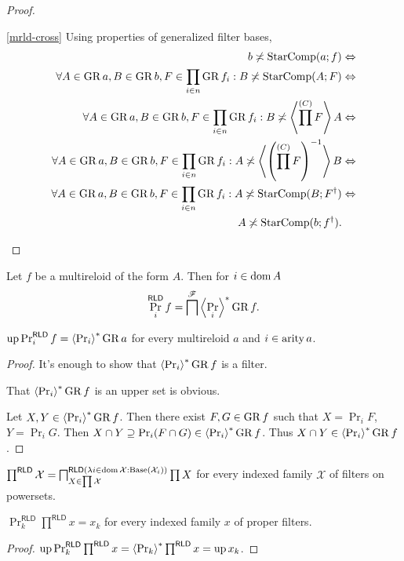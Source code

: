 \begin{proof}
\begin{widedisorder}
\item [{\ref{mrld-cross}}] Using properties of generalized filter bases,
\begin{align*}
b\not\asymp\operatorname{StarComp}(a;f) & \Leftrightarrow\\
\forall A\in\operatorname{GR} a,B\in\operatorname{GR} b,F\in\prod_{i\in n}\operatorname{GR} f_{i}:B\not\asymp\operatorname{StarComp}(A;F) & \Leftrightarrow\\
\forall A\in\operatorname{GR} a,B\in\operatorname{GR} b,F\in\prod_{i\in n}\operatorname{GR} f_{i}:B\not\asymp\left\langle \prod^{(C)}F\right\rangle A & \Leftrightarrow\\
\forall A\in\operatorname{GR} a,B\in\operatorname{GR} b,F\in\prod_{i\in n}\operatorname{GR} f_{i}:A\not\asymp\left\langle \left(\prod^{(C)}F\right)^{-1}\right\rangle B & \Leftrightarrow\\
\forall A\in\operatorname{GR} a,B\in\operatorname{GR} b,F\in\prod_{i\in n}\operatorname{GR} f_{i}:A\not\asymp\operatorname{StarComp}(B;F^{\dagger}) & \Leftrightarrow\\
A\not\asymp\operatorname{StarComp}(b;f^{\dagger}).
\end{align*}

\end{widedisorder}
\end{proof}
\begin{defn}
Let $f$ be a multireloid of the form $A$. Then for $i\in\operatorname{dom} A$
\[
\Pr_{i}^{\mathsf{RLD}}f=\bigsqcap^{\mathscr{F}}\left\langle \Pr_{i}\right\rangle ^{\ast}\operatorname{GR} f.
\]
\end{defn}
\begin{prop}
$\operatorname{up}\Pr_{i}^{\mathsf{RLD}}f=\left\langle \Pr_{i}\right\rangle ^{\ast}\operatorname{GR} a$ for every multireloid
$a$ and $i\in\operatorname{arity} a$.\end{prop}
\begin{proof}
It's enough to show that $\left\langle \Pr_{i}\right\rangle ^{\ast}\operatorname{GR} f$ is a filter.

That $\left\langle \Pr_{i}\right\rangle ^{\ast}\operatorname{GR} f$ is an upper set is obvious.

Let $X,Y\in\left\langle \Pr_{i}\right\rangle ^{\ast}\operatorname{GR} f$. Then there exist $F,G\in\operatorname{GR} f$
such that $X=\Pr_{i}F$, $Y=\Pr_{i}G$. Then $X\cap Y\supseteq\Pr_{i}(F\cap G)\in\left\langle \Pr_{i}\right\rangle ^{\ast}\operatorname{GR} f$.
Thus $X\cap Y\in\left\langle \Pr_{i}\right\rangle ^{\ast}\operatorname{GR} f$.\end{proof}
\begin{defn}
$\prod^{\mathsf{RLD}}\mathcal{X}=\bigsqcap_{X\in\prod\mathcal{X}}^{\mathsf{RLD}(\lambda i\in\operatorname{dom}\mathcal{X}:\operatorname{Base}(\mathcal{X}_{i}))}\prod X$
for every indexed family $\mathcal{X}$ of filters on powersets.\end{defn}
\begin{prop}
\label{Pr-prod-reloids}$\Pr_{k}^{\mathsf{RLD}}\prod^{\mathsf{RLD}}x=x_{k}$
for every indexed family $x$ of proper filters.\end{prop}
\begin{proof}
$\operatorname{up}\Pr_{k}^{\mathsf{RLD}}\prod^{\mathsf{RLD}}x=\left\langle \Pr_{k}\right\rangle ^{\ast}\prod^{\mathsf{RLD}}x=\operatorname{up} x_{k}$.\end{proof}
